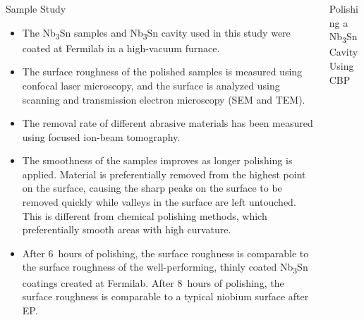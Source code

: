 \documentclass{beamer}
\begin{document}
\begin{frame}{}
\begin{columns}[t]
\begin{column}{0.32\linewidth}
\begin{block}{\label{sec:samplestudy}Sample Study}
\begin{itemize}
                        \item The Nb\textsubscript{3}Sn samples and Nb\textsubscript{3}Sn cavity used in this study were coated at Fermilab in a high-vacuum furnace.
                        \item The surface roughness of the polished samples is measured using confocal laser microscopy, and the surface is analyzed using scanning and transmission electron microscopy (SEM and TEM). 
                        \item The removal rate of different abrasive materials has been measured using focused ion-beam tomography.
                        \item The smoothness of the samples improves as longer polishing is applied. Material is preferentially removed from the highest point on the surface, causing the sharp peaks on the surface to be removed quickly while valleys in the surface are left untouched. This is different from chemical polishing methods, which preferentially smooth areas with high curvature.
                        \item After 6~hours of polishing, the surface roughness is comparable to the surface roughness of the well-performing, thinly coated Nb\textsubscript{3}Sn coatings created at Fermilab. After 8~hours of polishing, the surface roughness is comparable to a typical niobium surface after EP.
                    \end{itemize}
                \end{block}
            \end{column}
            \begin{column}{0.32\textwidth}
                \begin{block}{\label{sec:cavitycbp}Polishing a Nb\textsubscript{3}Sn Cavity Using CBP}
                    \begin{columns}
                        \begin{column}{0.45\columnwidth}
                            \begin{figure}[t]
                                \centering

\end{figure}
\end{column}
\end{columns}
\end{block}
\end{column}
\end{columns}
\end{frame}
\end{document}
